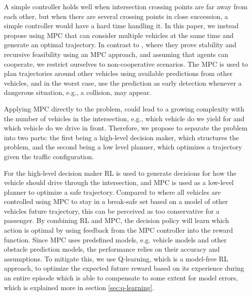 A simple controller holds well when intersection crossing points are far away from each other, but when there are several crossing points in close succession, a simple controller would have a hard time handling it. In this paper, we instead propose using MPC that can consider multiple vehicles at the same time and generate an optimal trajectory. In contrast to \cite{hult2018}, where they prove stability and recursive feasibility using an MPC approach, and assuming that agents can cooperate, we restrict ourselves to non-cooperative scenarios. 
The MPC is used to plan trajectories around other vehicles using available predictions from other vehicles, and in the worst case, use the prediction as early detection whenever a dangerous situation, e.g., a collision, may appear. 

Applying MPC directly to the problem, could lead to a growing complexity with the number of vehicles in the intersection, e.g., which vehicle do we yield for and which vehicle do we drive in front. Therefore, we propose to separate the problem into two parts: the first being a high-level decision maker, which structures the problem, and the second being a low level planner, which optimizes a trajectory given the traffic configuration. 

For the high-level decision maker RL is used to generate decisions for how the vehicle should drive through the intersection, and MPC is used as a low-level planner to optimize a safe trajectory. Compared to \cite{decentralizedMPC} where all vehicles are controlled using MPC to stay in a break-safe set based on a model of other vehicles future trajectory, this can be perceived as too conservative for a passenger. By combining RL and MPC, the decision policy will learn which action is optimal by using feedback from the MPC controller into the reward function. Since MPC uses predefined models, e.g. vehicle models and other obstacle prediction models, the performance relies on their accuracy and assumptions. To mitigate this, we use Q-learning, which is a model-free RL approach, to optimize the expected future reward based on its experience during an entire episode which is able to compensate to some extent for model errors, which is explained more in section \ref{sec:q-learning}. 

